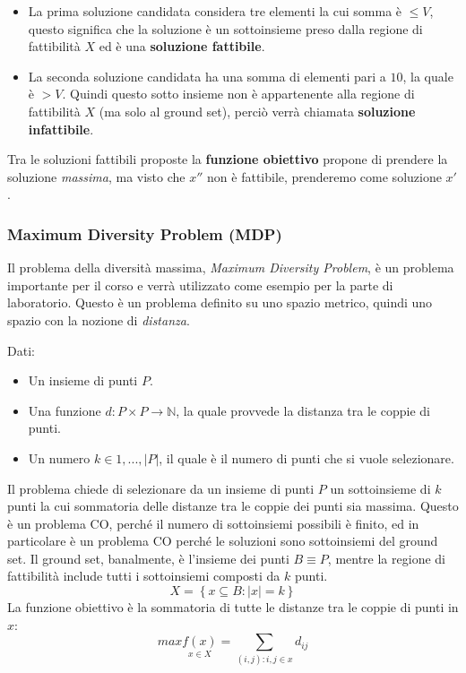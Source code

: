 \documentclass{article}
\begin{document}
\begin{itemize}
    \item La prima soluzione candidata considera tre elementi la cui somma è $\leq V$, questo significa che la
          soluzione è un sottoinsieme preso dalla regione di fattibilità $X$ ed è una \textbf{soluzione fattibile}.
    \item La seconda soluzione candidata ha una somma di elementi pari a $10$, la quale è $>V$. Quindi questo sotto insieme
          non è appartenente alla regione di fattibilità $X$ (ma solo al ground set), perciò verrà chiamata \textbf{soluzione infattibile}.
\end{itemize}

Tra le soluzioni fattibili proposte la \textbf{funzione obiettivo} propone di prendere la soluzione \textit{massima}, ma visto che $x''$ non è fattibile, prenderemo come soluzione $x'$.
\subsubsection{Maximum Diversity Problem (MDP)}
Il problema della diversità massima, \textit{Maximum Diversity Problem}, è un problema importante per il corso e
verrà utilizzato come esempio per la parte di laboratorio. Questo è un problema
definito su uno spazio metrico, quindi uno spazio con la nozione di \textit{distanza}.

Dati:
\begin{itemize}
    \item Un insieme di punti $P$.
    \item Una funzione $d:P \times P \rightarrow \mathbb{N}$, la quale provvede la distanza tra le coppie di punti.
    \item Un numero $k\in {1,...,|P|}$, il quale è il numero di punti che si vuole selezionare.
\end{itemize}

Il problema chiede di selezionare da un insieme di punti $P$ un sottoinsieme di $k$ punti la cui sommatoria delle distanze tra le coppie dei punti sia massima.
Questo è un problema CO, perché il numero di sottoinsiemi possibili è finito, ed in particolare è un problema CO perché le soluzioni sono sottoinsiemi del ground set.
Il ground set, banalmente, è l'insieme dei punti $B\equiv P$, mentre la regione di fattibilità include tutti i sottoinsiemi composti da $k$ punti.
$$X=\left\{x\subseteq B : |x| = k \right\}$$
La funzione obiettivo è la sommatoria di tutte le distanze tra le coppie di punti in $x$:
$$max\underset{x\in X}{f(x)}=\sum_{(i,j):i,j\in x}d_{ij}$$
\end{document}
